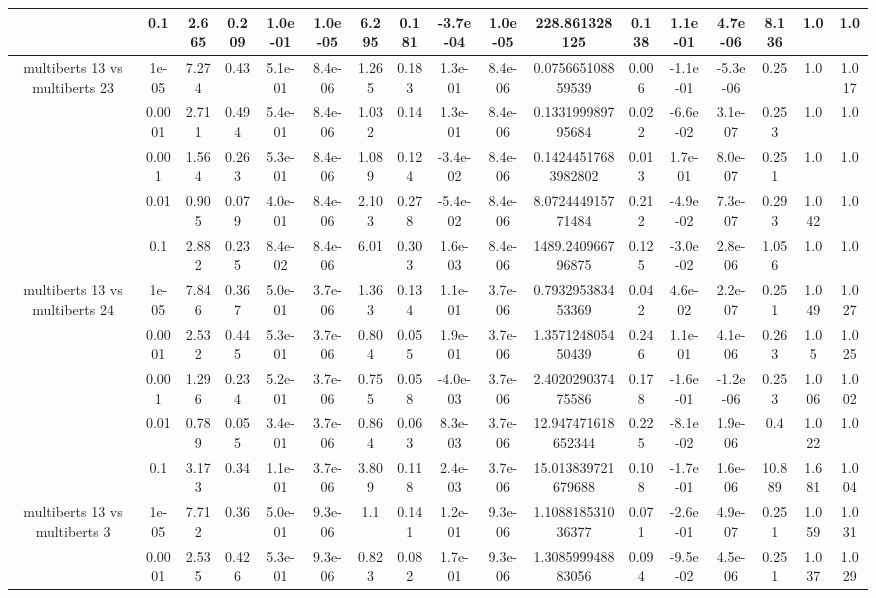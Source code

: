 \begin{tabular}{|c|c|c|c|c|c|c|c|c|c|c|c|c|c|c|c|c|}
 & 0.1 & 2.665 & 0.209 & 1.0e-01 & 1.0e-05 & 6.295 & 0.181 & -3.7e-04 & 1.0e-05 & 228.861328125 & 0.138 & 1.1e-01 & 4.7e-06 & 8.136 & 1.0 & 1.0 \\
\hline
\multirow{5}{*}{multiberts 13 vs multiberts 23} & 1e-05 & 7.274 & 0.43 & 5.1e-01 & 8.4e-06 & 1.265 & 0.183 & 1.3e-01 & 8.4e-06 & 0.075665108859539 & 0.006 & -1.1e-01 & -5.3e-06 & 0.25 & 1.0 & 1.017 \\
 & 0.0001 & 2.711 & 0.494 & 5.4e-01 & 8.4e-06 & 1.032 & 0.14 & 1.3e-01 & 8.4e-06 & 0.133199989795684 & 0.022 & -6.6e-02 & 3.1e-07 & 0.253 & 1.0 & 1.0 \\
 & 0.001 & 1.564 & 0.263 & 5.3e-01 & 8.4e-06 & 1.089 & 0.124 & -3.4e-02 & 8.4e-06 & 0.14244517683982802 & 0.013 & 1.7e-01 & 8.0e-07 & 0.251 & 1.0 & 1.0 \\
 & 0.01 & 0.905 & 0.079 & 4.0e-01 & 8.4e-06 & 2.103 & 0.278 & -5.4e-02 & 8.4e-06 & 8.072444915771484 & 0.212 & -4.9e-02 & 7.3e-07 & 0.293 & 1.042 & 1.0 \\
 & 0.1 & 2.882 & 0.235 & 8.4e-02 & 8.4e-06 & 6.01 & 0.303 & 1.6e-03 & 8.4e-06 & 1489.240966796875 & 0.125 & -3.0e-02 & 2.8e-06 & 1.056 & 1.0 & 1.0 \\
\hline
\multirow{5}{*}{multiberts 13 vs multiberts 24} & 1e-05 & 7.846 & 0.367 & 5.0e-01 & 3.7e-06 & 1.363 & 0.134 & 1.1e-01 & 3.7e-06 & 0.793295383453369 & 0.042 & 4.6e-02 & 2.2e-07 & 0.251 & 1.049 & 1.027 \\
 & 0.0001 & 2.532 & 0.445 & 5.3e-01 & 3.7e-06 & 0.804 & 0.055 & 1.9e-01 & 3.7e-06 & 1.357124805450439 & 0.246 & 1.1e-01 & 4.1e-06 & 0.263 & 1.05 & 1.025 \\
 & 0.001 & 1.296 & 0.234 & 5.2e-01 & 3.7e-06 & 0.755 & 0.058 & -4.0e-03 & 3.7e-06 & 2.402029037475586 & 0.178 & -1.6e-01 & -1.2e-06 & 0.253 & 1.006 & 1.002 \\
 & 0.01 & 0.789 & 0.055 & 3.4e-01 & 3.7e-06 & 0.864 & 0.063 & 8.3e-03 & 3.7e-06 & 12.947471618652344 & 0.225 & -8.1e-02 & 1.9e-06 & 0.4 & 1.022 & 1.0 \\
 & 0.1 & 3.173 & 0.34 & 1.1e-01 & 3.7e-06 & 3.809 & 0.118 & 2.4e-03 & 3.7e-06 & 15.013839721679688 & 0.108 & -1.7e-01 & 1.6e-06 & 10.889 & 1.681 & 1.004 \\
\hline
\multirow{5}{*}{multiberts 13 vs multiberts 3} & 1e-05 & 7.712 & 0.36 & 5.0e-01 & 9.3e-06 & 1.1 & 0.141 & 1.2e-01 & 9.3e-06 & 1.108818531036377 & 0.071 & -2.6e-01 & 4.9e-07 & 0.251 & 1.059 & 1.031 \\
 & 0.0001 & 2.535 & 0.426 & 5.3e-01 & 9.3e-06 & 0.823 & 0.082 & 1.7e-01 & 9.3e-06 & 1.308599948883056 & 0.094 & -9.5e-02 & 4.5e-06 & 0.251 & 1.037 & 1.029 \\

\end{tabular}
